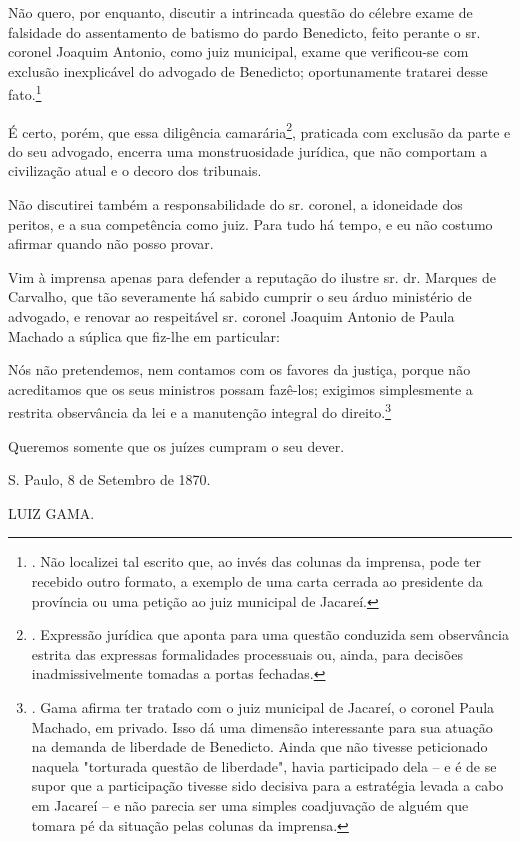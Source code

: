 Não quero, por enquanto, discutir a intrincada questão do célebre exame
de falsidade do assentamento de batismo do pardo Benedicto, feito
perante o sr. coronel Joaquim Antonio, como juiz municipal, exame que
verificou-se com exclusão inexplicável do advogado de Benedicto;
oportunamente tratarei desse fato.\footnote{. Não localizei tal escrito
  que, ao invés das colunas da imprensa, pode ter recebido outro
  formato, a exemplo de uma carta cerrada ao presidente da província ou
  uma petição ao juiz municipal de Jacareí.}

É certo, porém, que essa diligência camarária\footnote{. Expressão
  jurídica que aponta para uma questão conduzida sem observância estrita
  das expressas formalidades processuais ou, ainda, para decisões
  inadmissivelmente tomadas a portas fechadas.}, praticada com exclusão
da parte e do seu advogado, encerra uma monstruosidade jurídica, que não
comportam a civilização atual e o decoro dos tribunais.

Não discutirei também a responsabilidade do sr. coronel, a idoneidade
dos peritos, e a sua competência como juiz. Para tudo há tempo, e eu não
costumo afirmar quando não posso provar.

Vim à imprensa apenas para defender a reputação do ilustre sr. dr.
Marques de Carvalho, que tão severamente há sabido cumprir o seu árduo
ministério de advogado, e renovar ao respeitável sr. coronel Joaquim
Antonio de Paula Machado a súplica que fiz-lhe em particular:

Nós não pretendemos, nem contamos com os favores da justiça, porque não
acreditamos que os seus ministros possam fazê-los; exigimos simplesmente
a restrita observância da lei e a manutenção integral do
direito.\footnote{. Gama afirma ter tratado com o juiz municipal de
  Jacareí, o coronel Paula Machado, em privado. Isso dá uma dimensão
  interessante para sua atuação na demanda de liberdade de Benedicto.
  Ainda que não tivesse peticionado naquela "torturada questão de
  liberdade", havia participado dela -- e é de se supor que a
  participação tivesse sido decisiva para a estratégia levada a cabo em
  Jacareí -- e não parecia ser uma simples coadjuvação de alguém que
  tomara pé da situação pelas colunas da imprensa.}

Queremos somente que os juízes cumpram o seu dever.

S. Paulo, 8 de Setembro de 1870.

LUIZ GAMA.

